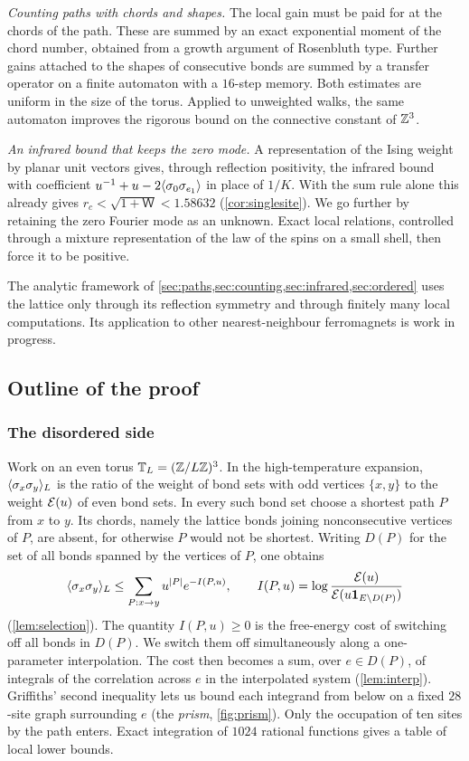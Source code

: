\emph{Counting paths with chords and shapes.} The local gain must be paid for at the chords of the path. These are summed by an exact exponential moment of the chord number, obtained from a growth argument of Rosenbluth type. Further gains attached to the shapes of consecutive bonds are summed by a transfer operator on a finite automaton with a $16$-step memory. Both estimates are uniform in the size of the torus. Applied to unweighted walks, the same automaton improves the rigorous bound on the connective constant of $\mathbb Z^3$.

\emph{An infrared bound that keeps the zero mode.} A representation of the Ising weight by planar unit vectors gives, through reflection positivity, the infrared bound with coefficient $u^{-1}+u-2\langle \sigma_0\sigma_{e_1}\rangle$ in place of $1/K$. With the sum rule alone this already gives $r_c<\sqrt{1+\mathsf W}<1.58632$ (\cref{cor:singlesite}). We go further by retaining the zero Fourier mode as an unknown. Exact local relations, controlled through a mixture representation of the law of the spins on a small shell, then force it to be positive.

The analytic framework of \cref{sec:paths,sec:counting,sec:infrared,sec:ordered} uses the lattice only through its reflection symmetry and through finitely many local computations. Its application to other nearest-neighbour ferromagnets is work in progress.

\subsection{Outline of the proof}

\subsubsection*{The disordered side}
Work on an even torus $\mathbb T_L=(\mathbb Z/L\mathbb Z)^3$. In the high-temperature expansion, $\langle \sigma_x\sigma_y\rangle_L$ is the ratio of the weight of bond sets with odd vertices $\{x,y\}$ to the weight $\mathcal E(u)$ of even bond sets. In every such bond set choose a shortest path $P$ from $x$ to $y$. Its chords, namely the lattice bonds joining nonconsecutive vertices of $P$, are absent, for otherwise $P$ would not be shortest. Writing $D(P)$ for the set of all bonds spanned by the vertices of $P$, one obtains
\[
 \langle \sigma_x\sigma_y\rangle_L\le\sum_{P:x\to y}u^{|P|}e^{-I(P,u)},\qquad
 I(P,u)=\log\frac{\mathcal E(u)}{\mathcal E(u\mathbf 1_{E\setminus D(P)})}
\]
(\cref{lem:selection}). The quantity $I(P,u)\ge0$ is the free-energy cost of switching off all bonds in $D(P)$. We switch them off simultaneously along a one-parameter interpolation. The cost then becomes a sum, over $e\in D(P)$, of integrals of the correlation across $e$ in the interpolated system (\cref{lem:interp}). Griffiths' second inequality lets us bound each integrand from below on a fixed $28$-site graph surrounding $e$ (the \emph{prism}, \cref{fig:prism}). Only the occupation of ten sites by the path enters. Exact integration of $1024$ rational functions gives a table of local lower bounds.


